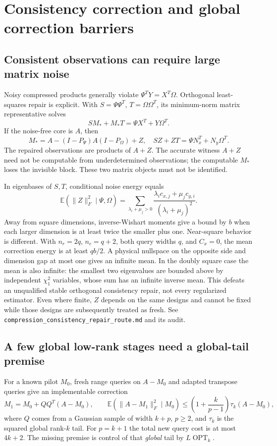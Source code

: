 \documentclass[11pt,oneside,openany,a4paper]{report}
\numberwithin{equation}{chapter}
\theoremstyle{definition}
\theoremstyle{remark}
\newcommand{\sourcefile}[1]{{\small\nolinkurl{#1}}}
\begin{document}
\section{Consistency correction and global correction barriers}
\label{sec:later-compression}

\subsection{Consistent observations can require large matrix noise}

Noisy compressed products generally violate
$\Psi^TY=X^T\Omega$.  Orthogonal least-squares repair is explicit.
With $S=\Psi\Psi^T$, $T=\Omega\Omega^T$, its minimum-norm matrix
representative solves
\[
 SM_*+M_*T=\Psi X^T+Y\Omega^T.
\]
If the noise-free core is $A$, then
\[
 M_*=A-(I-P_\Psi)A(I-P_\Omega)+Z,
 \quad SZ+ZT=\Psi N_x^T+N_y\Omega^T.
\]
The repaired observations are products of $A+Z$.  The accurate witness
$A+Z$ need not be computable from underdetermined observations; the
computable $M_*$ loses the invisible block.  These two matrix objects
must not be identified.

In eigenbases of $S,T$, conditional noise energy equals
\[
 \mathbb E(\|Z\|_F^2\mid\Psi,\Omega)
 =\sum_{\lambda_i+\mu_j>0}
   \frac{\lambda_i c_{x,j}+\mu_j c_{y,i}}
        {(\lambda_i+\mu_j)^2}.
\]
Away from square dimensions, inverse-Wishart moments give a bound by
$b$ when each larger dimension is at least twice the smaller plus one.
Near-square behavior is different.  With $n_r=2q$, $n_c=q+2$, both
query widths $q$, and $C_x=0$, the mean correction energy is at least
$qb/2$.  A physical nullspace on the opposite side and dimension gap
at most one gives an infinite mean.  In the doubly square case the
mean is also infinite: the smallest two eigenvalues are bounded above
by independent $\chi^2_1$ variables, whose sum has an infinite inverse
mean.  This defeats an unqualified stable orthogonal consistency
repair, not every regularized estimator.  Even where finite, $Z$ depends
on the same designs and cannot be fixed while those designs are
subsequently treated as fresh.
See \sourcefile{compression_consistency_repair_route.md} and its audit.

\subsection{A few global low-rank stages need a global-tail premise}

For a known pilot $M_0$, fresh range queries on $A-M_0$ and adapted
transpose queries give an implementable correction
\[
 M_1=M_0+QQ^T(A-M_0),\qquad
 \mathbb E(\|A-M_1\|_F^2\mid M_0)
 \le\left(1+\frac{k}{p-1}\right)\tau_k(A-M_0),
\]
where $Q$ comes from a Gaussian sample of width $k+p$, $p\ge2$, and
$\tau_k$ is the squared global rank-$k$ tail.  For $p=k+1$ the total
new query cost is at most $4k+2$.  The missing premise is control of
that \emph{global} tail by $L\operatorname{OPT}_k$.
\end{document}
